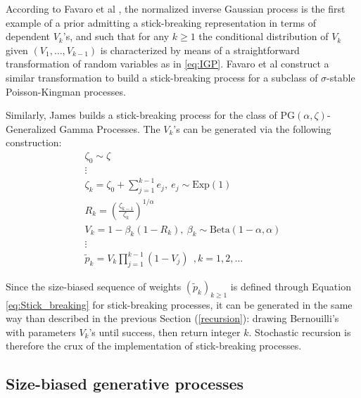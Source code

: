 According to Favaro et al \cite{Favaro:2014bo}, the normalized inverse Gaussian process \cite{Favaro:2012ht} is the first example of a prior admitting a stick-breaking representation in terms of dependent  $V_k$'s, and such that for any $k \ge 1$ the conditional distribution of $V_k$ given $(V_1,\dots,V_{k-1})$ is characterized by means of a straightforward transformation of random variables as in \ref{eq:IGP}.
Favaro et al \cite{Favaro:2014bo} construct a similar transformation to build a stick-breaking process for a subclass of $\sigma$-stable Poisson-Kingman processes.

Similarly, James \cite{James:2013uk} builds a stick-breaking process for the class of $\text{PG}(\alpha,\zeta)$-Generalized Gamma Processes. The $V_k$'s can be generated via the following construction:
\begin{gather*}
\zeta_0 \sim \zeta \\
\vdots \\
\zeta_k = \zeta_0 + \sum_{j=1}^{k-1}{e_j},\ e_j \sim \text{Exp}(1) \\
R_k = \left(\frac{\zeta_{k-1}}{\zeta_k}\right)^{1/\alpha} \\
V_k = 1 - \beta_k(1 - R_k), \ \beta_k \sim \text{Beta}(1-\alpha,\alpha) \\
\vdots \\
\tilde{p}_k = V_k \prod_{j=1}^{k-1}(1-V_j) \ \ ,k= 1,2,\dots
\end{gather*}

Since the size-biased sequence of weights $(\tilde{p}_k)_{k \ge 1}$ is defined through Equation \ref{eq:Stick_breaking} for stick-breaking processes, it can be generated in the same way than described in the previous Section (\ref{recursion}): drawing Bernouilli's with parameters $V_k$'s until success, then return integer $k$. Stochastic recursion is therefore the crux of the  implementation of stick-breaking processes.

\subsection{Size-biased generative processes}

